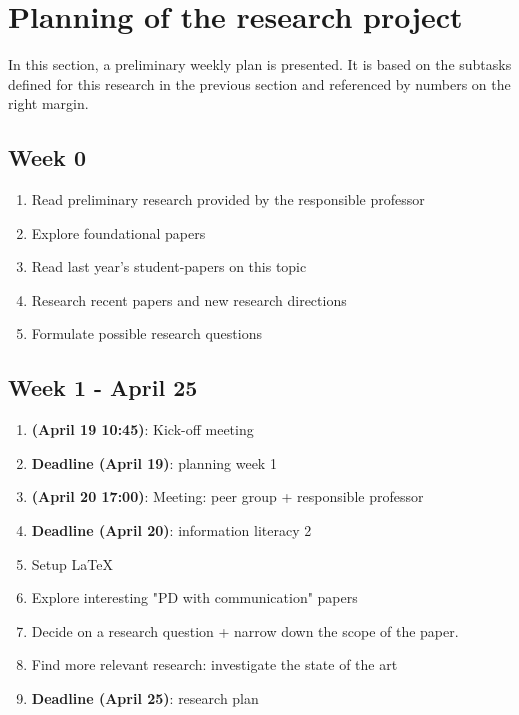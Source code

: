 \documentclass[english]{article}
\begin{document}
\section*{Planning of the research project}
In this section, a preliminary weekly plan is presented. It is based on the subtasks defined for this research in the previous section and referenced by numbers on the right margin.

\newcommand{\subtask}[1]{\hfill\textbf{(\ref{subtasks:#1})}}

\subsection*{Week 0}
\begin{enumerate}
\item Read preliminary research provided by the responsible professor
\item Explore foundational papers \citep{smaldino,Axelrod84}
\item Read last year's student-papers on this topic
\item Research recent papers and new research directions
\item Formulate possible research questions
\end{enumerate}

\subsection*{Week 1 - April 25}
\begin{enumerate}
\item \textbf{(April 19 10:45)}: Kick-off meeting
\item \textbf{Deadline (April 19)}: planning week 1
\item \textbf{(April 20 17:00)}: Meeting: peer group + responsible professor
\item \textbf{Deadline (April 20)}: information literacy 2
\item Setup \LaTeX
\item Explore interesting "PD with communication" papers
\item Decide on a research question + narrow down the scope of the paper.
\item Find more relevant research: investigate the state of the art
\item \textbf{Deadline (April 25)}: research plan
\end{enumerate}
\end{document}
